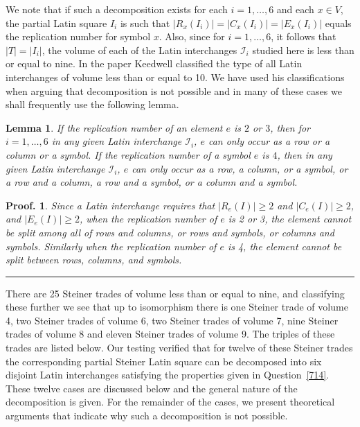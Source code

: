 \documentclass[12pt]{report}
\newtheorem{lemma}{Lemma}
\newtheorem{preproof}{{\bf Proof.}}
\newenvironment{proof}[1]{\begin{preproof}{\rm
               #1}\hfill{\rule[-0.5mm]{2mm}{2mm}}}{\end{preproof}}
\begin{document}
 We note that if such a decomposition exists for 
each $i=1,\dots, 6$ and each
$x\in V$, the partial Latin square $I_i$ is such 
that  $|R_x(I_i)|=|C_x(I_i)|=|E_x(I_i)|$ 
equals the replication number for symbol $x$. Also, since for 
$i=1,\dots, 6$, it follows that $|T|=|I_i|$,  the volume of each of the Latin 
interchanges ${\mathcal I}_i$ studied here is less than or equal to nine. In the 
paper  \cite{MR96a:05027} Keedwell classified the type of all 
Latin interchanges of volume less than or equal to 10. We have used 
his classifications when arguing that  decomposition is not possible 
and in many of these cases we shall frequently use the following lemma.

\begin{lemma}\label{lemma2} 
If the replication number of an element $e$ is $2$ or $3$, then 
for $i=1,\ldots,6$ in any given Latin interchange $\mathcal{I}_i$, 
$e$ can only occur as a row or a column
or a symbol.  If the replication number of a symbol $e$ is $4$,
then in any given Latin interchange $\mathcal{I}_i$, $e$ can only occur as a row,
a column, or a symbol, or a row and a column, a row and a symbol, 
or a column and a symbol.
\end{lemma}

\begin{proof} 
{
Since a Latin interchange requires that 
$|R_e(I)| \geq 2$ 
and $|C_e(I)| \geq 2$, and 
$|E_e(I)| \geq 2$, 
when the replication number of $e$
is 2 or 3, the element cannot be split among all of rows and columns,
or rows and symbols, or columns and symbols.  Similarly when
the replication number of $e$ is 4, the element cannot be split
between rows, columns, and symbols.
}
\end{proof}
\vspace{.5cm}

There are 25 Steiner trades of volume less than or equal to nine, and 
classifying these further we see that up to isomorphism there is one 
Steiner trade of volume 4, two Steiner trades of volume 6, two 
Steiner trades of volume 7, nine Steiner trades of volume 8 and eleven 
Steiner trades of volume 9. The triples of these trades are listed below. 
Our testing verified that for twelve of these Steiner trades the 
corresponding partial Steiner Latin square can be decomposed into six 
disjoint Latin interchanges satisfying the properties given in 
Question~\ref{714}. These twelve cases are discussed below and the general nature 
of the decomposition is given.  For the remainder of the cases, we present 
theoretical arguments  that indicate why such a 
decomposition is not possible. 
\vspace{.5cm}
\end{document}
